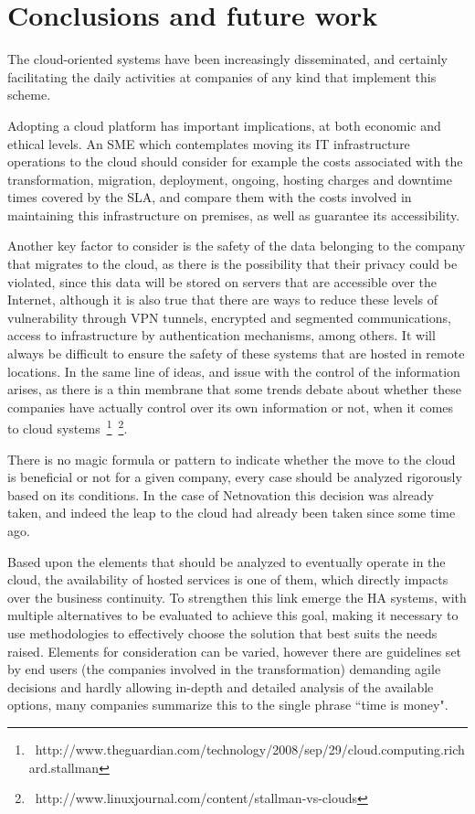 \documentclass[a4paper, 12pt]{book}
\begin{document}
%
\chapter{Conclusions and future work}
\label{chap:conclusions}

\noindent The cloud-oriented systems have been increasingly disseminated, and certainly facilitating the daily activities at companies of any kind that implement this scheme.\bigskip

\noindent Adopting a cloud platform has important implications, at both economic and ethical levels. An SME which contemplates moving its IT infrastructure operations to the cloud should consider for example the costs associated with the transformation, migration, deployment, ongoing, hosting charges and downtime times covered by the SLA, and compare them with the costs involved in maintaining this infrastructure on premises, as well as guarantee its accessibility.\bigskip

\noindent Another key factor to consider is the safety of the data belonging to the company that migrates to the cloud, as there is the possibility that their privacy could be violated, since this data will be stored on servers that are accessible over the Internet, although it is also true that there are ways to reduce these levels of vulnerability through VPN tunnels, encrypted and segmented communications, access to infrastructure by authentication mechanisms, among others. It will always be difficult to ensure the safety of these systems that are hosted in remote locations. In the same line of ideas, and issue with the control of the information arises, as there is a thin membrane that some trends debate about whether these companies have actually control over its own information or not, when it comes to cloud systems~\footnote{{\tiny\ http://www.theguardian.com/technology/2008/sep/29/cloud.computing.richard.stallman}}~\footnote{{\tiny\ http://www.linuxjournal.com/content/stallman-vs-clouds}}.\bigskip

\noindent There is no magic formula or pattern to indicate whether the move to the cloud is beneficial or not for a given company, every case should be analyzed rigorously based on its conditions. In the case of Netnovation this decision was already taken, and indeed the leap to the cloud had already been taken since some time ago.\bigskip

\noindent Based upon the elements that should be analyzed to eventually operate in the cloud, the availability of hosted services is one of them, which directly impacts over the business continuity. To strengthen this link emerge the HA systems, with multiple alternatives to be evaluated to achieve this goal, making it necessary to use methodologies to effectively choose the solution that best suits the needs raised. Elements for consideration can be varied, however there are guidelines set by end users (the companies involved in the transformation) demanding agile decisions and hardly allowing in-depth and detailed analysis of the available options, many companies summarize this to the single phrase ``time is money".\bigskip
\end{document}
